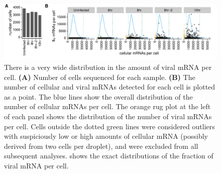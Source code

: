 \documentclass[9pt,lineno]{elife}
\begin{document}
\begin{figure}
\centerline{\includegraphics[width=\linewidth]{figures/p_cell_mRNA_summary.pdf}}
\caption{\label{fig:cells}
There is a very wide distribution in the amount of viral mRNA per cell.
{\bf (A)} 
Number of cells sequenced for each sample.
{\bf (B)} 
The number of cellular and viral mRNAs detected for each cell is plotted as a point.
The blue lines show the overall distribution of the number of cellular mRNAs per cell.
The orange rug plot at the left of each panel shows the distribution of the number of viral mRNAs per cell.
Cells outside the dotted green lines were considered outliers with suspiciously low or high amounts of cellular mRNA (possibly derived from two cells per droplet), and were excluded from all subsequent analyses.
 shows the exact distributions of the fraction of viral mRNA per cell.
}
\end{figure}
\end{document}
